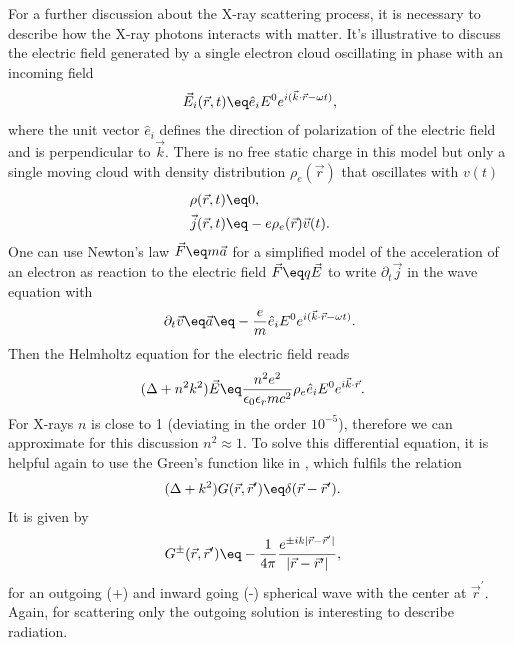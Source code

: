 \documentclass[\main/dresen_thesis.tex]{subfiles}
\begin{document}
    For a further discussion about the X-ray scattering process, it is necessary to describe how the X-ray photons interacts with matter.
    It's illustrative to discuss the electric field generated by a single electron cloud oscillating in phase with an incoming field
    \begin{align}
      \vec{E}_i (\vec{r}, t) \eq \hat{e}_i E^0 e^{i (\vec{k} \cdot \vec{r} - \omega t)},
    \end{align}
    where the unit vector $\hat{e}_i$ defines the direction of polarization of the electric field and is perpendicular to $\vec{k}$.
    There is no free static charge in this model but only a single moving cloud with density distribution $\rho_e(\vec{r})$ that oscillates with $v(t)$
    \begin{align}
      \rho (\vec{r}, t) \eq& 0,\\
      \vec{j} (\vec{r}, t) \eq& -e \rho_e(\vec{r}) \vec{v} (t).
    \end{align}
    One can use Newton's law $\vec{F} \eq m \vec{a}$ for a simplified model of the acceleration of an electron as reaction to the electric field $\vec{F} \eq q \vec{E}$ to write $\partial_t \vec{j}$ in the wave equation with
    \begin{align}
      \partial_t \vec{v} \eq \vec{a} \eq -\frac{e}{m} \hat{e}_i E^0 e^{i(\vec{k}\cdot \vec{r} - \omega t)}.
    \end{align}
    Then the Helmholtz equation for the electric field reads
    \begin{align}
      (\Delta + n^2 k^2 )\vec{E} \eq& \frac{n^2 e^2}{\epsilon_0 \epsilon_r m c^2} \rho_e \hat{e}_i E^0 e^{i\vec{k}\cdot \vec{r}}.
    \end{align}
    For X-rays $n$ is close to 1 (deviating in the order $10^{-5}$), therefore we can approximate for this discussion $n^2 \approx 1$.
    To solve this differential equation, it is helpful again to use the Green's function like in , which fulfils the relation
    \begin{align}
      (\Delta + k^2) G(\vec{r}, \vec{r}^\prime) \eq& \delta(\vec{r} - \vec{r}^\prime).
    \end{align}
    It is given by \cite{Jackson_1999_Class}
    \begin{align}
      G^{\pm}(\vec{r}, \vec{r}^\prime) \eq& - \frac{1}{4\pi} \frac{e^{\pm i k |\vec{r} - \vec{r}^\prime|}}{|\vec{r} - \vec{r}^\prime|},
    \end{align}
    for an outgoing (+) and inward going (-) spherical wave with the center at $\vec{r}^\prime$. Again, for scattering only the outgoing solution is interesting to describe radiation.
\end{document}
